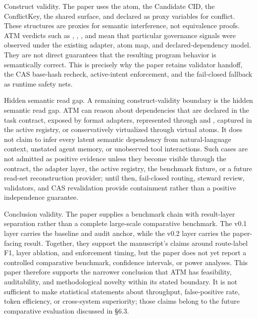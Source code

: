 \documentclass[9pt,letterpaper]{extarticle}
\begin{document}
Construct validity. The paper uses the atom, the Candidate CID, the ConflictKey, the shared surface, and declared \texttt{} as proxy variables for conflict. These structures are proxies for semantic interference, not equivalence proofs. ATM verdicts such as \texttt{}, \texttt{}, \texttt{}, and \texttt{} mean that particular governance signals were observed under the existing adapter, atom map, and declared-dependency model. They are not direct guarantees that the resulting program behavior is semantically correct. This is precisely why the paper retains validator handoff, the CAS base-hash recheck, active-intent enforcement, and the fail-closed fallback as runtime safety nets.

Hidden semantic read gap. A remaining construct-validity boundary is the hidden semantic read gap. ATM can reason about dependencies that are declared in the task contract, exposed by format adapters, represented through \texttt{} and \texttt{}, captured in the active registry, or conservatively virtualized through virtual atoms. It does not claim to infer every latent semantic dependency from natural-language context, unstated agent memory, or unobserved tool interactions. Such cases are not admitted as positive evidence unless they become visible through the contract, the adapter layer, the active registry, the benchmark fixture, or a future read-set reconstruction provider; until then, fail-closed routing, steward review, validators, and CAS revalidation provide containment rather than a positive independence guarantee.

Conclusion validity. The paper supplies a benchmark chain with result-layer separation rather than a complete large-scale comparative benchmark. The v0.1 layer carries the baseline and audit anchor, while the v0.2 layer carries the paper-facing result. Together, they support the manuscript's claims around route-label F1, layer ablation, and enforcement timing, but the paper does not yet report a controlled comparative benchmark, confidence intervals, or power analyses. This paper therefore supports the narrower conclusion that ATM has feasibility, auditability, and methodological novelty within its stated boundary. It is not sufficient to make statistical statements about throughput, false-positive rate, token efficiency, or cross-system superiority; those claims belong to the future comparative evaluation discussed in §6.3.
\end{document}

